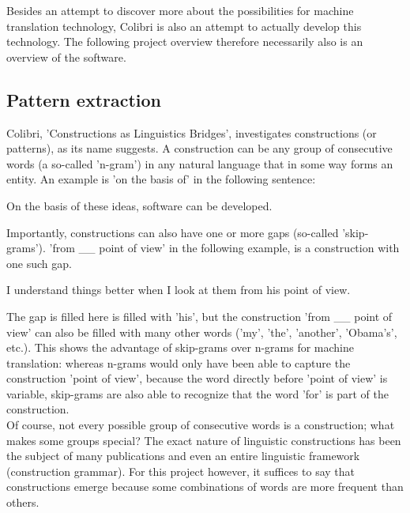 \documentclass[12pt]{article}
\begin{document}
Besides an attempt to discover more about the possibilities for machine translation technology, Colibri is also an attempt to actually develop this technology. The following project overview therefore necessarily also is an overview of the software.

\subsection{Pattern extraction}

Colibri, 'Constructions as Linguistics Bridges', investigates constructions (or patterns), as its name suggests. A construction can be any group of consecutive words (a so-called 'n-gram') in any natural language that in some way forms an entity. An example is 'on the basis of' in the following sentence:

\begin{examples}
\item On the basis of these ideas, software can be developed.
\end{examples}

Importantly, constructions can also have one or more gaps (so-called 'skip-grams'). 'from \_\_ point of view' in the following example, is a construction with one such gap. 

\begin{examples}
\item I understand things better when I look at them from his point of view.
\end{examples}

The gap is filled here is filled with 'his', but the construction 'from \_\_ point of view' can also be filled with many other words ('my', 'the', 'another', 'Obama's', etc.). This shows the advantage of skip-grams over n-grams for machine translation: whereas n-grams would only have been able to capture the construction 'point of view', because the word directly before 'point of view' is variable, skip-grams are also able to recognize that the word 'for' is part of the construction.\\\indent
Of course, not every possible group of consecutive words is a construction; what makes some groups special? The exact nature of linguistic constructions has been the subject of many publications and even an entire linguistic framework (construction grammar). For this project however, it suffices to say that constructions emerge because some combinations of words are more frequent than others.

\end{document}
